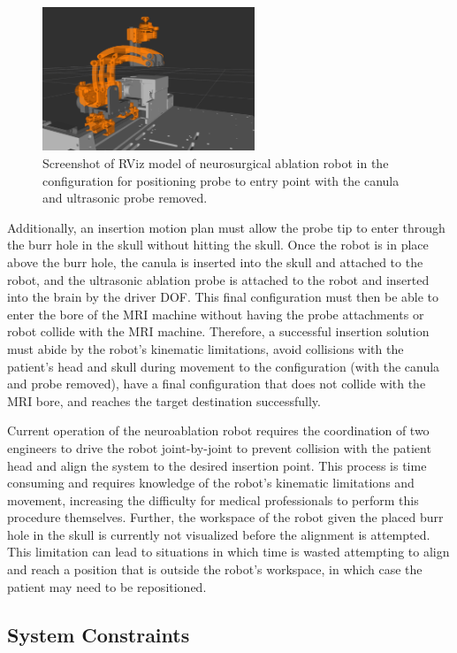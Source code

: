 \documentclass[12pt]{report}
\begin{document}
\begin{figure}[thpb]
	\centering
	\includegraphics[width = 2.5in]{images/neuro_no_probe.png}
    \caption{Screenshot of RViz model of neurosurgical ablation robot in the configuration for positioning probe to entry point with the canula and ultrasonic probe removed. }
    \label{fig:neuroRVizModelNoProbe}
\end{figure}

Additionally, an insertion motion plan must allow the probe tip to enter through the burr hole in the skull without hitting the skull. Once the robot is in place above the burr hole, the canula is inserted into the skull and attached to the robot, and the ultrasonic ablation probe is attached to the robot and inserted into the brain by the driver DOF. This final configuration must then be able to enter the bore of the MRI machine without having the probe attachments or robot collide with the MRI machine. Therefore, a successful insertion solution must abide by the robot’s kinematic limitations, avoid collisions with the patient’s head and skull during movement to the configuration (with the canula and probe removed), have a final configuration that does not collide with the MRI bore, and reaches the target destination successfully.

Current operation of the neuroablation robot requires the coordination of two engineers to drive the robot joint-by-joint to prevent collision with the patient head and align the system to the desired insertion point. This process is time consuming and requires knowledge of the robot’s kinematic limitations and movement, increasing the difficulty for medical professionals to perform this procedure themselves. Further, the workspace of the robot given the placed burr hole in the skull is currently not visualized before the alignment is attempted. This limitation can lead to situations in which time is wasted attempting to align and reach a position that is outside the robot’s workspace, in which case the patient may need to be repositioned.

\subsection{System Constraints}
\end{document}
